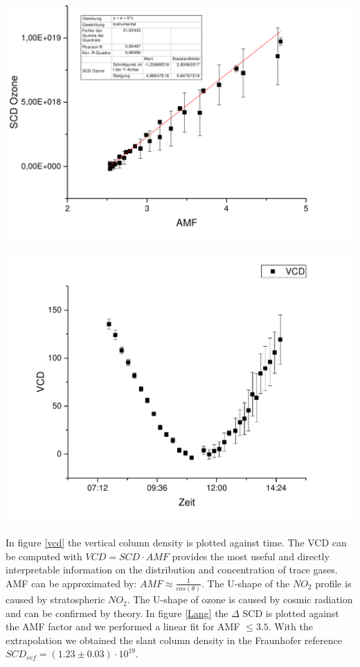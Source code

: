 \documentclass[12pt, english]{scrartcl} %
\newenvironment{Figure}
  {\par\medskip\noindent\minipage{\linewidth}}
  {\endminipage\par\medskip}
\begin{document}
\begin{multicols}{2}
\begin{Figure}
  \label{O2}
\end{Figure}
\begin{Figure}
 \centering
 \captionsetup{format=plain}
 \includegraphics[width=\linewidth]{graphics/o3langley.pdf}
  \label{Lang}
\end{Figure}
\begin{Figure}
 \centering
 \captionsetup{format=plain}
 \includegraphics[width=\linewidth]{graphics/03vcd.pdf}
  \label{vcd}
\end{Figure}
In figure \ref{vcd} the vertical column density is plotted against time. The VCD can be computed with $VCD = SCD \cdot AMF$ provides the most useful and directly interpretable information on the distribution and concentration of trace gases. AMF can be approximated by: $AMF \approx \frac{1}{cos(\theta)}$. The U-shape of the $NO_2$ profile is caused by stratospheric $NO_2$. The U-shape of ozone is caused by cosmic radiation and can be confirmed by theory. In figure \ref{Lang} the $\Delta$ SCD is plotted against the AMF factor and we performed a linear fit for AMF $\leq 3.5$. With the extrapolation we obtained the slant column density in the Fraunhofer reference $SCD_{ref} =( 1.23\pm 0.03 ) \cdot 10^{19} $.

\end{multicols}
\end{document}
